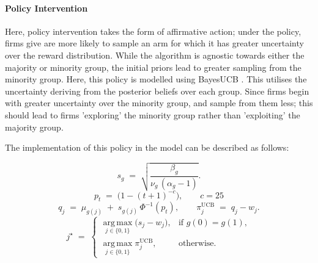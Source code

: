 \documentclass[]{article}
\begin{document}
\paragraph{Policy Intervention}

Here, policy intervention takes the form of affirmative action; under the policy, firms give are more likely to sample an arm for which it has greater uncertainty over the reward distribution. While the algorithm is agnostic towards either the majority or minority group, the initial priors lead to greater sampling from the minority group. 
Here, this policy is modelled using BayesUCB \citep{kaufmann2012}. This utilises the uncertainty deriving from the posterior beliefs over each group. Since firms begin with greater uncertainty over the minority group, and sample from them less; this should lead to firms 'exploring' the minority group rather than 'exploiting' the majority group.

\noindent The implementation of this policy in the model can be described as follows:

\begin{equation}
	s_{g} \;=\; \sqrt{\dfrac{\beta_{g}}{\nu_{g}\,(\alpha_{g}-1)}}.
	\label{eq:epistemic_sd}
\end{equation}
\begin{equation}
	p_t \;=\; \Big(1 - (t+1)^{-c}\Big),
	\qquad c = 25
	\label{eq:ucb_quantile}
\end{equation}
\begin{equation}
	q_{j} \;=\; \mu_{g(j)} \;+\; s_{g(j)}\,\Phi^{-1}(p_t),
	\qquad
	\pi^{\mathrm{UCB}}_{j} \;=\; q_{j} - w_{j}.
	\label{eq:ucb_index}
\end{equation}
\begin{equation}
	j^{\star} \;=\;
	\begin{cases}
		\displaystyle \operatorname*{arg\,max}_{j\in\{0,1\}} \big(s_j - w_j\big),
		& \text{if } g(0) = g(1),\\[2.2ex]
		\displaystyle \operatorname*{arg\,max}_{j\in\{0,1\}} \pi^{\mathrm{UCB}}_{j},
		& \text{otherwise.}
	\end{cases}
	\label{eq:ucb_choice}
\end{equation}
\end{document}
